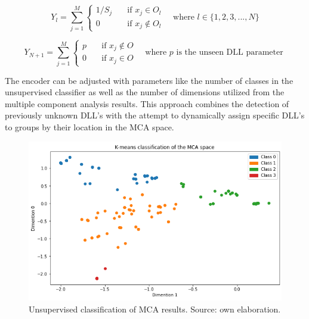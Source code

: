 \documentclass[a4paper,twoside,12pt]{book}
\begin{document}
\begin{equation} \label{enc_eqn}
	Y_{l} = 
	\sum_{j=1}^{M}
	\begin{cases}
		1/S_{j}       & \quad \text{if } x_{j} \in O_{l}\\
		0  & \quad \text{if } x_{j} \notin O_{l}
	  \end{cases} \quad \text{where }l \in \{1, 2, 3, ..., N\}
\end{equation}

\begin{equation} \label{enc_new_eqn}
	Y_{N+1} = 
	\sum_{j=1}^{M}
	\begin{cases}
		p      & \quad \text{if } x_{j} \notin O\\
		0  & \quad \text{if } x_{j} \in O
	  \end{cases} \quad \text{where }p \text{ is the unseen DLL parameter }
\end{equation}

The encoder can be adjusted with parameters like the number of classes in the unsupervised 
classifier as well as the number of dimensions utilized from the multiple component analysis results. 
This approach combines the detection of previously unknown DLL's with the attempt to dynamically
assign specific DLL's to groups by their location in the MCA space. 


 \begin{figure}
	\centering
	\includegraphics[scale=0.9]{images/KmeanMCA}
	\caption{Unsupervised classification of MCA results. Source: own elaboration.}
	\label{fig:kmeanmca}
 \end{figure}
\end{document}
